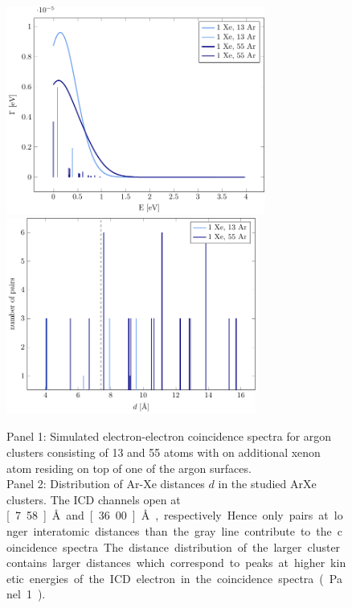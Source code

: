 \begin{figure}[ht]
 \centering
 \includegraphics[width=8.5cm]{pics/surf.pdf}\\
 \includegraphics[width=8.2cm]{pics/R_comp.pdf}
 \caption{Panel 1: Simulated electron-electron coincidence spectra
          for argon clusters
          consisting of 13 and 55 atoms with on additional xenon atom residing
          on top of one of the argon surfaces.\\
          Panel 2: Distribution of Ar-Xe distances $d$ in the studied ArXe
          clusters. The ICD channels open at \unit[7.58]{\AA} and
          \unit[36.00]{\AA}, respectively. Hence only pairs at longer interatomic
          distances than the gray line contribute to the coincidence spectra.
          The distance distribution of the larger cluster contains larger
          distances which correspond to peaks at higher kinetic energies of
          the ICD electron in the coincidence spectra (Panel 1).}
 \label{figure:surf}
\end{figure}

